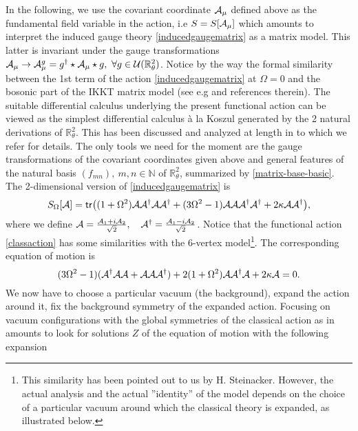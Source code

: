 \documentclass[a4paper,11pt,twoside]{article}
\numberwithin{equation}{section}
\newcommand{\tr}{\mathsf{tr}}
\theoremstyle{nonumberplain}
\begin{document}
In the following, we use the covariant coordinate ${\cal{A}}_\mu$  defined above as the fundamental field variable in the action, i.e $S=S[{\cal{A}}_\mu]$ which amounts to interpret the induced gauge theory \eqref{inducedgaugematrix} as a matrix model. This latter is invariant under the gauge transformations ${\cal{A}}_\mu\rightarrow{\cal{A}}_\mu^g=g^\dag\star{\cal{A}}_\mu\star g,\ \forall g\in{\cal{U}}(\mathbb{R}^2_\theta)$. Notice by the way the formal similarity between the 1st term of the action \eqref{inducedgaugematrix} at $\Omega=0$ and the bosonic part of the IKKT matrix model (see e.g \cite{blasch-stein-10} and references therein). The suitable differential calculus underlying the present functional action can be viewed as the simplest differential calculus \`a la Koszul generated by the 2 natural derivations of $\mathbb{R}^2_\theta$. This has been discussed and analyzed at length in \cite{WAL1,WAL2} to which we refer for details. The only tools we need for the moment are the gauge transformations 
of the covariant coordinates given above and general features of the natural basis $(f_{mn}),\ m,n\in\mathbb{N}$ of $\mathbb{R}^2_\theta$, summarized by \eqref{matrix-base-basic}. The 2-dimensional version of \eqref{inducedgaugematrix} is
\begin{equation}
S_\Omega[\mathcal{A}]=\tr\big((1+\Omega^2){\cal{A}}{\cal{A}^\dag}{\cal{A}}{\cal{A}}^\dag+(3\Omega^2-1){\cal{A}}{\cal{A}}{\cal{A}}^\dag{\cal{A}}^\dag+
2\kappa{\cal{A}}
{\cal{A}}^\dag\big)\label{classaction},
\end{equation}
where we define ${\cal{A}}={{{\cal{A}}_1+i{\cal{A}}_2}\over{\sqrt{2}}},\quad {{\cal{A}}}^\dag={{{\cal{A}}_1-i{\cal{A}}_2}\over{\sqrt{2}}}$.
Notice that the functional action \eqref{classaction} has some similarities with the 6-vertex model\footnote{This similarity has been pointed out to us by H. Steinacker. However, the actual analysis and the actual ''identity'' of the model depends on the choice of a particular vacuum around which the classical theory is expanded, as illustrated below.}. The corresponding equation of motion is 
\begin{equation}
(3\Omega^2-1)({\cal{A}}^\dag{\cal{A}}{\cal{A}}+{\cal{A}}{\cal{A}}{\cal{A}}^\dag)+2(1+\Omega^2){\cal{A}}{\cal{A}}^\dag{\cal{A}}+2\kappa{\cal{A}}=0\label{eqmotion}.
\end{equation}
We now have to choose a particular vacuum (the background), expand the action around it, fix the background symmetry of the expanded action. Focusing on vacuum configurations with the global symmetries of the classical action as in \cite{GWW2} amounts to look for solutions $Z$ of the equation of motion with the following expansion
\end{document}
